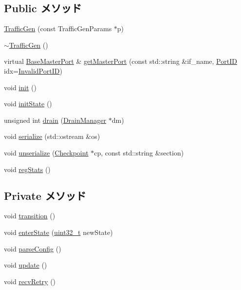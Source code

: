 \subsection*{Public メソッド}
\begin{DoxyCompactItemize}
\item 
\hyperlink{classTrafficGen_a146890cf5f9e59c2f8c33edfb1502488}{TrafficGen} (const TrafficGenParams $\ast$p)
\item 
\hyperlink{classTrafficGen_a5667988c9607ce8d7e3eabd0ebe860f6}{$\sim$TrafficGen} ()
\item 
virtual \hyperlink{classBaseMasterPort}{BaseMasterPort} \& \hyperlink{classTrafficGen_a54ebb5edc195c159b56a39e6f15b9932}{getMasterPort} (const std::string \&if\_\-name, \hyperlink{base_2types_8hh_acef4d7d41cb21fdc252e20c04cd7bb8e}{PortID} idx=\hyperlink{base_2types_8hh_a65bf40f138cf863f0c5e2d8ca1144126}{InvalidPortID})
\item 
void \hyperlink{classTrafficGen_a02fd73d861ef2e4aabb38c0c9ff82947}{init} ()
\item 
void \hyperlink{classTrafficGen_a3c34ea9b29f410748d4435a667484924}{initState} ()
\item 
unsigned int \hyperlink{classTrafficGen_aa8a18d230dba7a674ac8a0b4f35bc36a}{drain} (\hyperlink{classDrainManager}{DrainManager} $\ast$dm)
\item 
void \hyperlink{classTrafficGen_a53e036786d17361be4c7320d39c99b84}{serialize} (std::ostream \&os)
\item 
void \hyperlink{classTrafficGen_af22e5d6d660b97db37003ac61ac4ee49}{unserialize} (\hyperlink{classCheckpoint}{Checkpoint} $\ast$cp, const std::string \&section)
\item 
void \hyperlink{classTrafficGen_a4dc637449366fcdfc4e764cdf12d9b11}{regStats} ()
\end{DoxyCompactItemize}
\subsection*{Private メソッド}
\begin{DoxyCompactItemize}
\item 
void \hyperlink{classTrafficGen_aab0a81b788e7282586c12953fa5e0c37}{transition} ()
\item 
void \hyperlink{classTrafficGen_a1346cf8b75d4ba67a861233a8651601d}{enterState} (\hyperlink{Type_8hh_a435d1572bf3f880d55459d9805097f62}{uint32\_\-t} newState)
\item 
void \hyperlink{classTrafficGen_a7719d247662a43429aac025090db5704}{parseConfig} ()
\item 
void \hyperlink{classTrafficGen_ac5c54df7ed3b930268c8d7752c101725}{update} ()
\item 
void \hyperlink{classTrafficGen_a29cb5a4f98063ce6e9210eacbdb35298}{recvRetry} ()
\end{DoxyCompactItemize}
